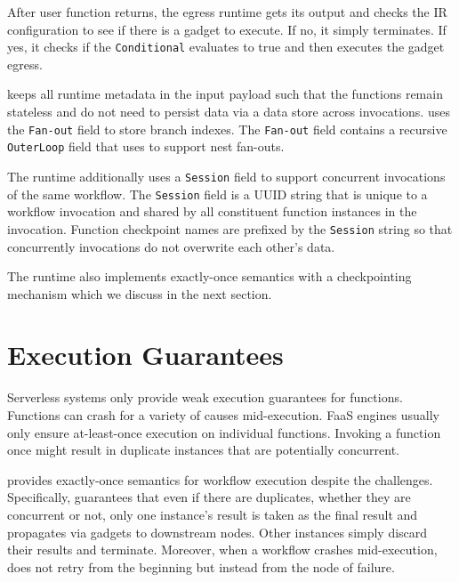 After user function returns, the egress runtime gets its output and checks the
IR configuration to see if there is a gadget to execute. If no, it simply
terminates. If yes, it checks if the \texttt{Conditional} evaluates to true
and then executes the gadget egress.

\name{} keeps all runtime metadata in the input payload such that the
functions remain stateless and do not need to persist data via a data store
across invocations. \name{} uses the \texttt{Fan-out} field to store branch
indexes. The \texttt{Fan-out} field contains a recursive \texttt{OuterLoop}
field that \name{} uses to support nest fan-outs.

The runtime additionally uses a \texttt{Session} field to support concurrent
invocations of the same workflow. The \texttt{Session} field is a UUID string
that is unique to a workflow invocation and shared by all constituent function
instances in the invocation. Function checkpoint names are prefixed by the
\texttt{Session} string so that concurrently invocations do not overwrite each
other's data.

The \name{} runtime also implements exactly-once semantics with a
checkpointing mechanism which we discuss in the next section.


\section{Execution Guarantees}

Serverless systems only provide weak execution guarantees for functions.
Functions can crash for a variety of causes mid-execution. FaaS engines
usually only ensure at-least-once execution on individual functions. Invoking
a function once might result in duplicate instances that are potentially
concurrent.

\name{} provides exactly-once semantics for workflow execution despite the
challenges. Specifically, \name{} guarantees that even if there are
duplicates, whether they are concurrent or not, only one instance's result is
taken as the final result and propagates via gadgets to downstream nodes.
Other instances simply discard their results and terminate. Moreover, when a
workflow crashes mid-execution, \name{} does not retry from the beginning but
instead from the node of failure.

